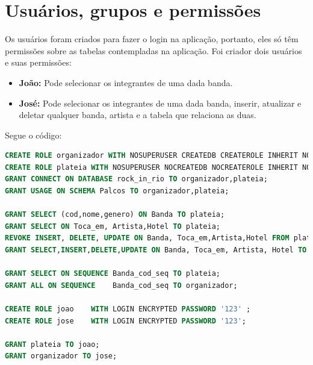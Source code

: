 \documentclass[12pt]{article}
\begin{document}
\section{Usuários, grupos e permissões}
Os usuários foram criados para fazer o login na aplicação, portanto, eles só têm permissões sobre as tabelas contempladas na aplicação. Foi criador dois usuários e suas permissões:
\begin{itemize}
	\item \textbf{João:} Pode selecionar os integrantes de uma dada banda.
	\item \textbf{José:} Pode selecionar os integrantes de uma dada banda, inserir, atualizar e deletar qualquer banda, artista e a tabela que relaciona as duas.
\end{itemize}
Segue o código:
\begin{lstlisting}[language=sql]
CREATE ROLE organizador WITH NOSUPERUSER CREATEDB CREATEROLE INHERIT NOLOGIN NOREPLICATION CONNECTION LIMIT -1;  
CREATE ROLE plateia WITH NOSUPERUSER NOCREATEDB NOCREATEROLE INHERIT NOLOGIN NOREPLICATION CONNECTION LIMIT -1;  
GRANT CONNECT ON DATABASE rock_in_rio TO organizador,plateia;
GRANT USAGE ON SCHEMA Palcos TO organizador,plateia;

GRANT SELECT (cod,nome,genero) ON Banda TO plateia;
GRANT SELECT ON Toca_em, Artista,Hotel TO plateia;
REVOKE INSERT, DELETE, UPDATE ON Banda, Toca_em,Artista,Hotel FROM plateia;
GRANT SELECT,INSERT,DELETE,UPDATE ON Banda, Toca_em, Artista, Hotel TO organizador;

GRANT SELECT ON SEQUENCE Banda_cod_seq TO plateia;
GRANT ALL ON SEQUENCE    Banda_cod_seq TO organizador;

CREATE ROLE joao    WITH LOGIN ENCRYPTED PASSWORD '123' ;
CREATE ROLE jose    WITH LOGIN ENCRYPTED PASSWORD '123';

GRANT plateia TO joao;
GRANT organizador TO jose;
\end{lstlisting}
\pagebreak
\appendix
\end{document}
